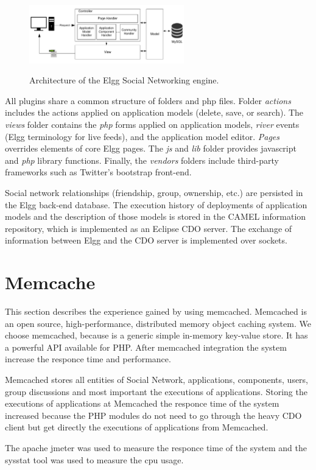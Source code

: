 \begin{figure}[h]
	\caption{Architecture of the Elgg Social Networking engine.}
	\includegraphics[width=0.6\textwidth,natwidth=200,natheight=150]{./fig/elgg_architecture.pdf}
	\centering
	\label{fig:elgg_architecture}
\end{figure}


All plugins share a common structure of folders and php files. Folder {\em actions} includes the actions applied on application models (delete, save, or search). The {\em views} folder contains the {\em php} forms applied on application models, {\em river} events (Elgg terminology for live feeds), and the application model editor. {\em Pages} overrides elements of core Elgg pages.  The {\em js} and {\em lib} folder provides javascript and {\em php} library functions. Finally, the {\em vendors} folders include third-party frameworks such as Twitter's bootstrap front-end.

Social network relationships (friendship, group, ownership, etc.) are persisted in the Elgg back-end database. The execution history of deployments of application models and the description of those models is stored in the CAMEL information repository, which is implemented as an Eclipse CDO server. The exchange of information between Elgg and the CDO server is implemented over sockets.

\section{Memcache}
\label{sec:memcache_implementation}
This section describes the experience gained by using memcached\cite{memcache_url}. Memcached is an open source, high-performance, distributed memory object caching system. We choose memcached, because is a generic simple in-memory key-value store. It has a powerful API available for PHP. After memcached integration the system increase the responce time and performance.

Memcached stores all entities of Social Network, applications, components, users, group discussions and most important the executions of applications. Storing the executions of applications at Memcached the responce time of the system increased because the PHP modules do not need to go through the heavy CDO client but get directly the executions of applications from Memcached.

The apache jmeter\cite{jmeter_url} was used to measure the responce time of the system and the sysstat tool\cite{sysstat_url} was used to measure the cpu usage.  

